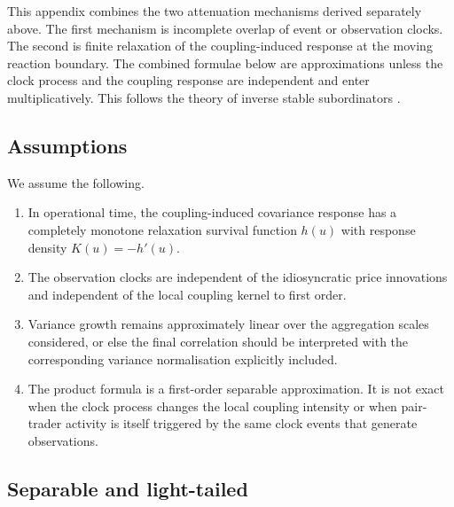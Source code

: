 \documentclass[5p,final]{elsarticle}
\begin{document}
This appendix combines the two attenuation mechanisms derived separately above.  The first mechanism is incomplete overlap of event or observation clocks.  The second is finite relaxation of the coupling-induced response at the moving reaction boundary.  The combined formulae below are approximations unless the clock process and the coupling response are independent and enter multiplicatively. This follows the theory of inverse stable subordinators \citep{MeerschaertStraka2013}.

\subsection{Assumptions}

We assume the following.
\begin{enumerate}
\item[(C1)] In operational time, the coupling-induced covariance response has a completely monotone relaxation survival function $h(u)$ with response density $K(u)=-h'(u)$.
\item[(C2)] The observation clocks are independent of the idiosyncratic price innovations and independent of the local coupling kernel to first order.
\item[(C3)] Variance growth remains approximately linear over the aggregation scales considered, or else the final correlation should be interpreted with the corresponding variance normalisation explicitly included.
\item[(C4)] The product formula is a first-order separable approximation.  It is not exact when the clock process changes the local coupling intensity or when pair-trader activity is itself triggered by the same clock events that generate observations.
\end{enumerate}

\subsection{Separable and light-tailed}
\end{document}
